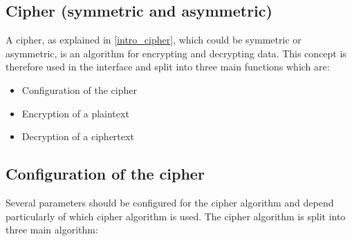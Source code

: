 \subsection{Cipher (symmetric and asymmetric)}
\label{gci_ciph}
A cipher, as explained in \ref{intro_cipher}, which
could be symmetric or asymmetric, is an algorithm for encrypting and decrypting
data.
This concept is therefore used in the interface and split into three main
functions which are:
\begin{itemize}[noitemsep]
  \item Configuration of the cipher
  \item Encryption of a plaintext
  \item Decryption of a ciphertext
\end{itemize}

\subsection*{Configuration of the cipher}
Several parameters should be configured for the cipher algorithm and depend
particularly of which cipher algorithm is used.
The cipher algorithm is split into three main algorithm:

